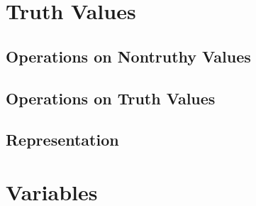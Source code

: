 \section{Truth Values}


\subsection{Operations on Nontruthy Values}
\subsection{Operations on Truth Values}

\subsection{Representation}


\csharpsubsection{\csharp}

\section{Variables}
\csharpsubsection{\csharp}

